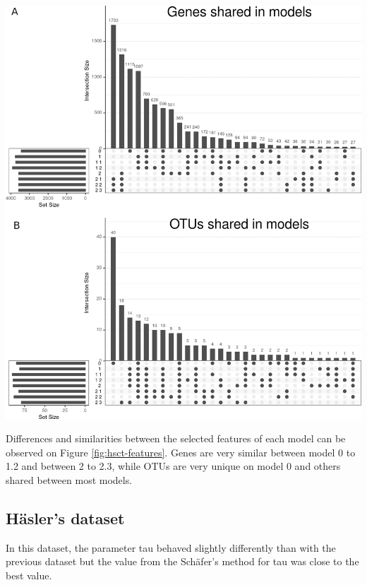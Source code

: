 \documentclass[
  a4paper,
]{book}
\let\origfigure\figure
\let\endorigfigure\endfigure
\renewenvironment{figure}[1][2] {
    \expandafter\origfigure\expandafter[!ht]
} {
    \endorigfigure
}
\begin{document}
\begin{figure}
\centering
\includegraphics{images/hsct-features.png}
\caption{\label{fig:hsct-features} Upset plot of the variables selected on each model from 0 to 2.3 showing the intersection between them regarding genes and OTUs.}
\end{figure}

Differences and similarities between the selected features of each model can be observed on Figure \ref{fig:hsct-features}.
Genes are very similar between model 0 to 1.2 and between 2 to 2.3, while OTUs are very unique on model 0 and others shared between most models.

\hypertarget{results-hasler}{%
\subsection{Häsler's dataset}\label{results-hasler}}

In this dataset, the parameter tau behaved slightly differently than with the previous dataset but the value from the Schäfer's method for tau was close to the best value.
\end{document}
